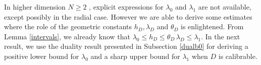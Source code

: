 \documentclass[reqno,11pt]{amsart}
\theoremstyle{definition}
\numberwithin{equation}{section}
\newcommand{\1}{{{\bf 1}\kern-0,28em\rm l}}
\newcommand{\med}{\medskip\noindent}
\newcommand{\pare}[1]{\left(#1\right)}
\def\l{\lambda}
\begin{document}
%
%
%

 
\med

In higher dimension $N\ge 2$ , explicit expressions for $\l_0$ and $\l_1$ are not available, except possibly in the radial case.
However we are able to derive some estimates where the role of the geometric constants   $h_D, \l_D$ and $\theta_D$ is enlightened. 
From Lemma \ref{intervals}, we already know that $\l_0 \le h_D \le \theta_D\, \lambda_D \le \l_1$.
In the next result, we use the duality result presented in Subsection \ref{dualb0} for deriving a positive lower bound for $\l_0$ and a sharp upper bound for $\l_1$ when  $D$ is calibrable.
\end{document}
